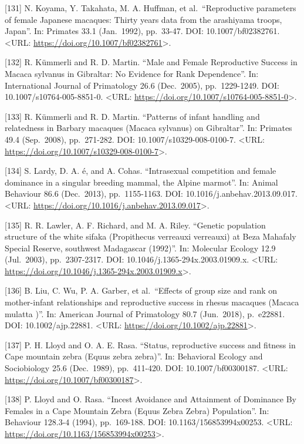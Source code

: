 \documentclass[
]{article}
\begin{document}
{[}131{]} N. Koyama, Y. Takahata, M. A. Huffman, et al.~``Reproductive
parameters of female Japanese macaques: Thirty years data from the
arashiyama troops, Japan''. In: Primates 33.1 (Jan.~1992), pp.~33-47.
DOI: 10.1007/bf02382761. \textless URL:
\url{https://doi.org/10.1007/bf02382761}\textgreater.

{[}132{]} R. Kümmerli and R. D. Martin. ``Male and Female Reproductive
Success in Macaca sylvanus in Gibraltar: No Evidence for Rank
Dependence''. In: International Journal of Primatology 26.6 (Dec.~2005),
pp.~1229-1249. DOI: 10.1007/s10764-005-8851-0. \textless URL:
\url{https://doi.org/10.1007/s10764-005-8851-0}\textgreater.

{[}133{]} R. Kümmerli and R. D. Martin. ``Patterns of infant handling
and relatedness in Barbary macaques (Macaca sylvanus) on Gibraltar''.
In: Primates 49.4 (Sep.~2008), pp.~271-282. DOI:
10.1007/s10329-008-0100-7. \textless URL:
\url{https://doi.org/10.1007/s10329-008-0100-7}\textgreater.

{[}134{]} S. Lardy, D. A. é, and A. Cohas. ``Intrasexual competition and
female dominance in a singular breeding mammal, the Alpine marmot''. In:
Animal Behaviour 86.6 (Dec.~2013), pp.~1155-1163. DOI:
10.1016/j.anbehav.2013.09.017. \textless URL:
\url{https://doi.org/10.1016/j.anbehav.2013.09.017}\textgreater.

{[}135{]} R. R. Lawler, A. F. Richard, and M. A. Riley. ``Genetic
population structure of the white sifaka (Propithecus verreauxi
verreauxi) at Beza Mahafaly Special Reserve, southwest Madagascar
(1992)''. In: Molecular Ecology 12.9 (Jul.~2003), pp.~2307-2317. DOI:
10.1046/j.1365-294x.2003.01909.x. \textless URL:
\url{https://doi.org/10.1046/j.1365-294x.2003.01909.x}\textgreater.

{[}136{]} B. Liu, C. Wu, P. A. Garber, et al.~``Effects of group size
and rank on mother-infant relationships and reproductive success in
rhesus macaques (Macaca mulatta )''. In: American Journal of Primatology
80.7 (Jun.~2018), p.~e22881. DOI: 10.1002/ajp.22881. \textless URL:
\url{https://doi.org/10.1002/ajp.22881}\textgreater.

{[}137{]} P. H. Lloyd and O. A. E. Rasa. ``Status, reproductive success
and fitness in Cape mountain zebra (Equus zebra zebra)''. In: Behavioral
Ecology and Sociobiology 25.6 (Dec.~1989), pp.~411-420. DOI:
10.1007/bf00300187. \textless URL:
\url{https://doi.org/10.1007/bf00300187}\textgreater.

{[}138{]} P. Lloyd and O. Rasa. ``Incest Avoidance and Attainment of
Dominance By Females in a Cape Mountain Zebra (Equus Zebra Zebra)
Population''. In: Behaviour 128.3-4 (1994), pp.~169-188. DOI:
10.1163/156853994x00253. \textless URL:
\url{https://doi.org/10.1163/156853994x00253}\textgreater.
\end{document}
